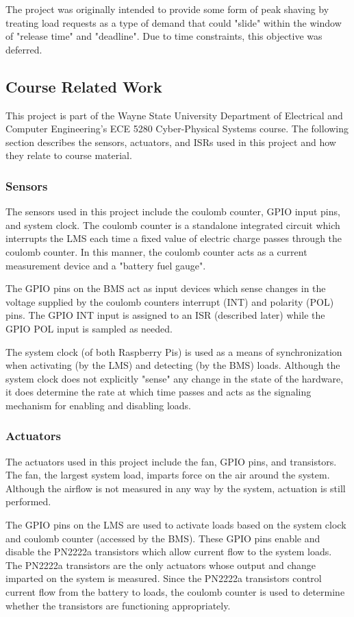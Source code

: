 \documentclass[11pt,conference,draftcls,onecolumn]{IEEEtran}
\begin{document}
The project was originally intended to provide some form of peak shaving by treating load requests as a type of demand that could "slide" within the window of "release time" and "deadline".
Due to time constraints, this objective was deferred.

\subsection{Course Related Work}
This project is part of the Wayne State University Department of Electrical and Computer Engineering's ECE 5280 Cyber-Physical Systems course.
The following section describes the sensors, actuators, and ISRs used in this project and how they relate to course material.

\subsubsection{Sensors}
The sensors used in this project include the coulomb counter, GPIO input pins, and system clock.
The coulomb counter is a standalone integrated circuit which interrupts the LMS each time a fixed value of electric charge passes through the coulomb counter.
In this manner, the coulomb counter acts as a current measurement device and a "battery fuel gauge".

The GPIO pins on the BMS act as input devices which sense changes in the voltage supplied by the coulomb counters interrupt (INT) and polarity (POL) pins.
The GPIO INT input is assigned to an ISR (described later) while the GPIO POL input is sampled as needed. 

The system clock (of both Raspberry Pis) is used as a means of synchronization when activating (by the LMS) and detecting (by the BMS) loads.
Although the system clock does not explicitly "sense" any change in the state of the hardware, it does determine the rate at which time passes and acts as the signaling mechanism for enabling and disabling loads.

\subsubsection{Actuators}
The actuators used in this project include the fan, GPIO pins, and transistors.
The fan, the largest system load, imparts force on the air around the system.
Although the airflow is not measured in any way by the system, actuation is still performed.

The GPIO pins on the LMS are used to activate loads based on the system clock and coulomb counter (accessed by the BMS).
These GPIO pins enable and disable the PN2222a transistors which allow current flow to the system loads.
The PN2222a transistors are the only actuators whose output and change imparted on the system is measured.
Since the PN2222a transistors control current flow from the battery to loads, the coulomb counter is used to determine whether the transistors are functioning appropriately.
\end{document}
